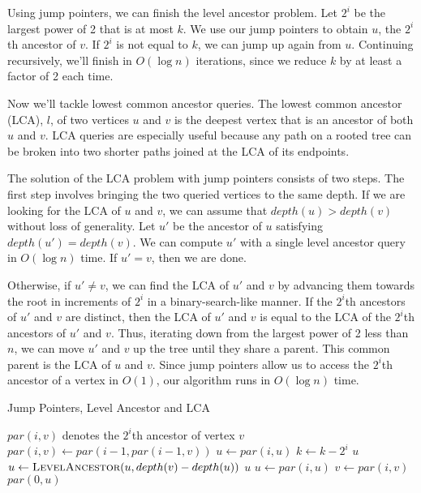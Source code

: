Using jump pointers, we can finish the level ancestor problem. Let $2^i$ be the largest power of 2 that is at most $k$. We use our jump pointers to obtain $u$, the $2^i$th ancestor of $v$. If $2^i$ is not equal to $k$, we can jump up again from $u$. Continuing recursively, we'll finish in $O(\log n)$ iterations, since we reduce $k$ by at least a factor of 2 each time.

Now we'll tackle lowest common ancestor queries. The lowest common ancestor (LCA), $l$, of two vertices $u$ and $v$ is the deepest vertex that is an ancestor of both $u$ and $v$. LCA queries are especially useful because any path on a rooted tree can be broken into two shorter paths joined at the LCA of its endpoints.

The solution of the LCA problem with jump pointers consists of two steps. The first step involves bringing the two queried vertices to the same depth. If we are looking for the LCA of $u$ and $v$, we can assume that $depth(u) > depth(v)$ without loss of generality. Let $u'$ be the ancestor of $u$ satisfying $depth(u') = depth(v)$. We can compute $u'$ with a single level ancestor query in $O(\log n)$ time. If $u' = v$, then we are done.

Otherwise, if $u' \neq v$, we can find the LCA of $u'$ and $v$ by advancing them towards the root in increments of $2^i$ in a binary-search-like manner. If the $2^i$th ancestors of $u'$ and $v$ are distinct, then the LCA of $u'$ and $v$ is equal to the LCA of the $2^i$th ancestors of $u'$ and $v$. Thus, iterating down from the largest power of 2 less than $n$, we can move $u'$ and $v$ up the tree until they share a parent. This common parent is the LCA of $u$ and $v$. Since jump pointers allow us to access the $2^i$th ancestor of a vertex in $O(1)$, our algorithm runs in $O(\log n)$ time.

\begin{algorithm}[H]
\caption{Jump Pointers, Level Ancestor and LCA}
\begin{algorithmic}
  \State $par(i, v)$ denotes the $2^i$th ancestor of vertex $v$
      \State $par(i, v) \gets par(i - 1, par(i - 1, v))$
    \EndFor
  \EndFor
\EndFunction
{}
      \State $u \gets par(i, u)$
      \State $k \gets k - 2^i$
    \EndIf
  \EndFor
  \State \Return $u$
\EndFunction
{}
    \State {}
  \EndIf
  \State $u \gets \Call{LevelAncestor}{u, depth(v) - depth(u)}$
    \State \Return $u$
  \EndIf
      \State $u \gets par(i, u)$
      \State $v \gets par(i, v)$
    \EndIf
  \EndFor
  \State \Return $par(0, u)$
\EndFunction
\end{algorithmic}
\end{algorithm}

